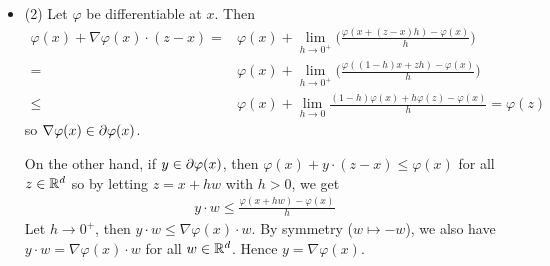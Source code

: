 \documentclass[12pt,a4paper]{article}
\newenvironment{proof}
{\begin{changemargin}{1cm}{0.5cm} 
	}%
	{\end{changemargin}
}
\renewenvironment{i}
{\begin{itemize} 
	}%
	{\end{itemize}
}
\newenvironment{p}
{\begin{proof} 
	}%
	{\end{proof}
}
\begin{document}
\begin{p}
\begin{i}
(b) We show $\varphi$ is Lipschitz continuous on $B(x, \delta^*/2\sqrt{d})$. Let $x_1, x_2 \in B(x, \delta^*/2\sqrt{d})$ where $x_1 \neq x_2$. Take $x_3$ to be the intersection of the line through $x_1$ and $x_2$ with $\pa B(x, \delta^*/\sqrt{d})$ and choose $x_3$ such that $x_2$ lies between $x_1$ and $x_3$. Define $\lambda = \frac{|x_2 - x_3|}{|x_1 -x_3|} \in (0,1)$. Now,
\begin{align*}
\lambda x_1 + (1- \lambda) x_3 =& \lambda x_2 + \lambda( x_1 - x_2) + (1- \lambda )x_2 + (1- \lambda)(x_3 - x_2) \\
=& x_2 + \frac{|x_2 -x_3|}{|x_1 -x_3|} (x_1 -x_2) + \frac{|x_1- x_3| - |x_2 -x_3|}{|x_2 - x_3|}(x_3 -x_2) \\
=& x_2 + \frac{1}{|x_1-x_3|} \big( |x_2 - x_3| (x_1-x_2) + |x_1 - x_2|(x_3 -x_2) \big) \\
=& x_2
\end{align*}
By convexity of $\varphi$,
\begin{align*}
\varphi(x_2) & \leq (1- \lambda) \varphi(x_3) + \lambda \varphi(x_1) \\
\Rightarrow \quad  \varphi(x_2) - \varphi(x_1) &\leq (1- \lambda)(\varphi(x_3) - \varphi(x_1)) = \frac{|x_1 -x_2|}{|x_1 -x_3|}(\varphi(x_3) - \varphi(x_1)) \\
& \leq \frac{2\sqrt{d}\times 2M}{\delta^*}|x_1 -x_2| = L|x_1 -x_2|
\end{align*}
with $L = 4\sqrt{d}M/ \delta^*$. So $\varphi$ is Lipschitz. \emph{[This proof looks very complicated but the idea is very simple!]}

\item[(2)] Let $\varphi$ be differentiable at $x$. Then
\begin{align*}
\varphi(x) + \nabla \varphi(x) \cdot (z-x) =& \varphi(x) + \lim_{h\rightarrow 0^+} \Big( \frac{\varphi(x + (z-x)h) - \varphi (x)}{h} \Big) \\
=& \varphi(x) + \lim_{h\rightarrow 0^+} \Big( \frac{\varphi((1-h)x + zh) - \varphi (x)}{h} \Big) \\
\leq & \varphi(x) + \lim_{h\rightarrow 0} \frac{(1-h)\varphi(x) + h\varphi(z) - \varphi(x)}{h} =\varphi(z) 
\end{align*}
so $\nabla \varphi(x) \in \partial \varphi(x)$.

\quad On the other hand, if $y\in \partial \varphi(x)$, then $\varphi(x) + y\cdot(z-x) \leq \varphi(x)$ for all $z\in \mathbb{R}^d$ so by letting $z= x+ hw$ with $h>0$, we get
\begin{align*}
y\cdot w \leq \frac{\varphi(x+ hw) - \varphi(x)}{h}
\end{align*}
Let $h\rightarrow 0^+$, then $y\cdot w \leq \nabla \varphi(x) \cdot w$. By symmetry ($w\mapsto -w$), we also have $y\cdot w = \nabla \varphi(x) \cdot w$ for all $w\in \mathbb{R}^d$. Hence $y= \nabla \varphi(x)$.
\end{i}
\eop
\end{p}
\s
\end{document}
